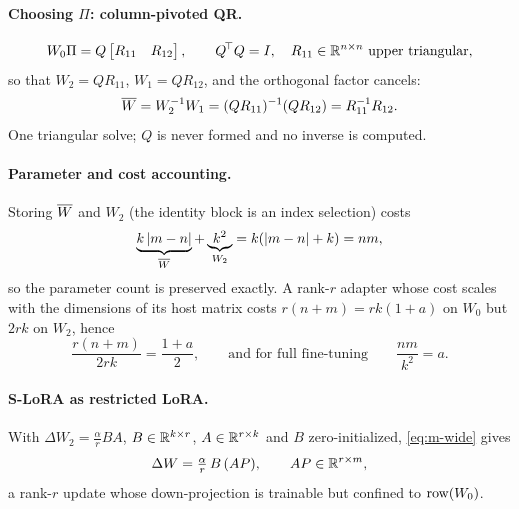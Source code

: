 \paragraph{Choosing $\Pi$: column-pivoted QR.}
\begin{equation}
  W_0\Pi=Q\begin{bmatrix}R_{11} & R_{12}\end{bmatrix},\qquad
  Q^{\!\top}Q=I,\quad R_{11}\in\mathbb{R}^{n\times n}\ \text{upper triangular},
  \label{eq:m-qr}
\end{equation}
so that $W_2=QR_{11}$, $W_1=QR_{12}$, and the orthogonal factor cancels:
\begin{equation}
  \overline{W}=W_2^{-1}W_1=(QR_{11})^{-1}(QR_{12})=R_{11}^{-1}R_{12}.
  \label{eq:m-qcancel}
\end{equation}
One triangular solve; $Q$ is never formed and no inverse is computed.

\paragraph{Parameter and cost accounting.}
Storing $\overline{W}$ and $W_2$ (the identity block is an index selection) costs
\begin{equation}
  \underbrace{k\left|m-n\right|}_{\overline{W}}+\underbrace{k^{2}}_{W_2}
  =k\!\left(\left|m-n\right|+k\right)=nm ,
  \label{eq:m-preserve}
\end{equation}
so the parameter count is preserved exactly. A rank-$r$ adapter whose cost
scales with the dimensions of its host matrix costs $r(n+m)=rk(1+a)$ on $W_0$
but $2rk$ on $W_2$, hence
\begin{equation}
  \frac{r(n+m)}{2rk}=\frac{1+a}{2},
  \qquad\text{and for full fine-tuning}\qquad
  \frac{nm}{k^{2}}=a .
  \label{eq:m-advantage}
\end{equation}

\paragraph{S-LoRA as restricted LoRA.}
With $\Delta W_2=\tfrac{\alpha}{r}BA$, $B\in\mathbb{R}^{k\times r}$,
$A\in\mathbb{R}^{r\times k}$ and $B$ zero-initialized, \eqref{eq:m-wide} gives
\begin{equation}
  \Delta W=\tfrac{\alpha}{r}\,B\,(AP),
  \qquad AP\in\mathbb{R}^{r\times m},
  \label{eq:m-restricted}
\end{equation}
a rank-$r$ update whose down-projection is trainable but confined to
$\operatorname{row}(W_0)$.

